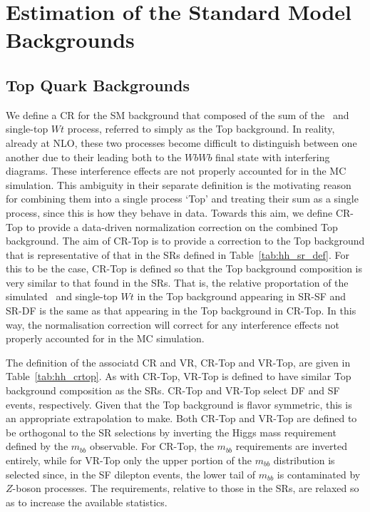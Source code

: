 \section{Estimation of the Standard Model Backgrounds}
\label{sec:hh_background_estimate}

%
%

\FloatBarrier
\subsection{Top Quark Backgrounds}
\label{sec:cr_top}

We define a CR for the SM background that composed of the sum of the \ttbar~and single-top $Wt$
process, referred to simply as the Top background.
In reality, already at NLO, these two processes become difficult to distinguish between one another
due to their leading both to the $WbWb$ final state with interfering diagrams.
These interference effects are not properly accounted for in the MC simulation.
This ambiguity in their separate definition is the motivating reason for combining them into a single
process `Top' and treating their sum as a single process, since this is how they behave in data.
Towards this aim, we define CR-Top to provide a data-driven normalization correction on the combined Top
background.
The aim of CR-Top is to provide a correction to the Top background that is representative of that in the SRs
defined in Table~\ref{tab:hh_sr_def}.
For this to be the case, CR-Top is defined so that the Top background composition is very similar to that
found in the SRs.
That is, the relative proportation of the simulated \ttbar~and single-top $Wt$ in the Top background appearing
in SR-SF and SR-DF is the same as that appearing in the Top background in CR-Top.
In this way, the normalisation correction will correct for any interference effects not properly accounted for
in the MC simulation.

The definition of the associatd CR and VR, CR-Top and VR-Top, are given in Table~\ref{tab:hh_crtop}.
As with CR-Top, VR-Top is defined to have similar Top background composition as the SRs.
CR-Top and VR-Top select DF and SF events, respectively.
Given that the Top background is flavor symmetric, this is an appropriate extrapolation to make.
Both CR-Top and VR-Top are defined to be orthogonal to the SR selections by inverting the Higgs mass requirement
defined by the $m_{bb}$ observable.
For CR-Top, the $m_{bb}$ requirements are inverted entirely, while for VR-Top only the upper portion of the $m_{bb}$
distribution is selected since, in the SF dilepton events, the lower tail of $m_{bb}$ is contaminated by $Z$-boson
processes.
The \dhh requirements, relative to those in the SRs, are relaxed so as to increase the available statistics.

